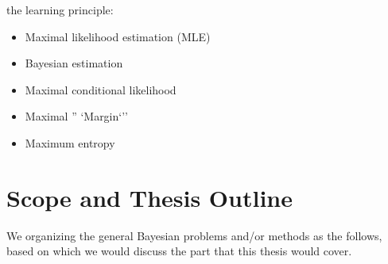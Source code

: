 the learning principle:
\begin{itemize}
\item Maximal likelihood estimation (MLE)
\item Bayesian estimation
\item Maximal conditional likelihood
\item Maximal '' `Margin`''
\item Maximum entropy
\end{itemize}



\section{Scope and Thesis Outline}
We organizing the general Bayesian problems and/or methods as the follows, based on which we would discuss the part that this thesis would cover.

